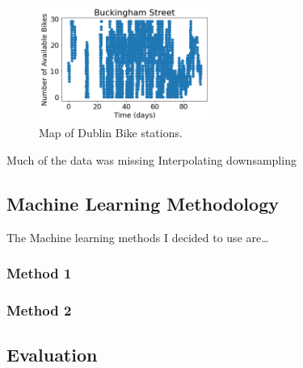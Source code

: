 \begin{figure}[H]
    \centering
    \includegraphics[width=0.5\textwidth]{images/buckingham data.png}
    \caption{Map of Dublin Bike stations.}
    \end{figure}
Much of the data was missing
Interpolating
downsampling

\par 


\subsection{Machine Learning Methodology}
The Machine learning methods I decided to use are\dots
\subsubsection{Method 1}
\subsubsection{Method 2}

\subsection{Evaluation}
